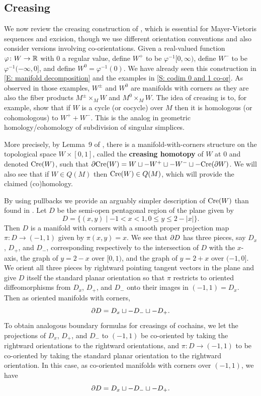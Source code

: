 


\subsection{Creasing}\label{S: creasing}

We now review the creasing construction of \cite[Section 2.4]{Lipy14}, which is essential for Mayer-Vietoris sequences and excision, though we use different orientation conventions and also consider versions involving co-orientations.
Given a real-valued function $\varphi \colon W \to \mathbb{R}$ with $0$ a regular value,
define $W^+$ to be $\varphi^{-1} [0, \infty)$, define $W^-$ to be $\varphi^{-1} (-\infty, 0]$, and define $W^0=\varphi^{-1}(0)$. We have already seen this construction in \cref{E: manifold decomposition} and the examples in \cref{S: codim 0 and 1 co-or}.
 As observed in those examples, $W^\pm$ and $W^0$
are manifolds with corners as they are also the fiber products $M^\pm\times_M W$ and $M^0\times_M W$. The idea of creasing is to, for example, show that if $W$ is a cycle (or cocycle) over $M$ then it is homologous (or cohomologous) to $W^++W^-$. This is the analog in geometric homology/cohomology of subdivision of singular simplices.


More precisely, by Lemma~9 of \cite{Lipy14}, there is a manifold-with-corners structure on the topological space $W \times [0,1]$,
called the \textbf{creasing homotopy} of $W$ at $0$ and denoted $\mathrm{Cre}(W)$, such that $\partial \mathrm{Cre}(W)=W\sqcup -W^+\sqcup -W^-\sqcup - \mathrm{Cre}(\partial W)$. We will also see that if $W\in Q(M)$ then $\mathrm{Cre}(W)\in Q(M)$, which will provide the claimed (co)homology.



By using pullbacks we provide an arguably simpler description of $\mathrm{Cre}(W)$ than found in \cite{Lipy14}. Let $D$ be the semi-open pentagonal region of the plane given by $$D=\{(x,y)\mid -1<x<1, 0\leq y\leq 2-|x|\}.$$
Then $D$ is a manifold with corners with a smooth proper projection map $\pi:D\to (-1,1)$ given by $\pi(x,y)=x$. We see that $\partial D$ has three pieces, say $D_x$, $D_+$, and $D_-$, corresponding respectively to the intersection of $D$ with the $x$-axis, the graph of $y=2-x$ over $[0,1)$, and the graph of $y=2+x$ over $(-1, 0]$. We orient all three pieces by rightward pointing tangent vectors in the plane and give $D$ itself the standard planar orientation so that $\pi$ restricts to oriented diffeomorphisms from $D_x$, $D_+$, and $D_-$ onto their images in $(-1,1)=D_x$. Then as oriented manifolds with corners, $$\partial D=D_x\sqcup -D_-\sqcup -D_+.$$
To obtain analogous boundary formulas for creasings of cochains, we let the projections of $D_x$, $D_+$, and $D_-$ to $(-1,1)$ be co-oriented  by taking the rightward orientations to the rightward orientations, and $\pi:D\to (-1,1)$ to be co-oriented by taking the standard planar orientation to the rightward orientation. In this case, as co-oriented manifolds with corners over $(-1,1)$, we have
 $$\partial D=D_x\sqcup -D_-\sqcup -D_+.$$

